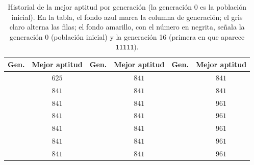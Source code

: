 \begin{table}[H]
\centering
\footnotesize
\setlength{\tabcolsep}{4pt}
\renewcommand{\arraystretch}{1.15}
\begin{tabular}{|c|c|c|c|c|c|}
\hline
\rowcolor{encabezado}\textbf{Gen.} & \textbf{Mejor aptitud} & \textbf{Gen.} & \textbf{Mejor aptitud} & \textbf{Gen.} & \textbf{Mejor aptitud} \\
\hline
\cellcolor{destacado}{\bfseries\boldmath $0$} & \cellcolor{destacado}$625$ & \cellcolor{iteracion}{\bfseries\boldmath $7$} & $841$ & \cellcolor{iteracion}{\bfseries\boldmath $14$} & $841$ \\
\hline
\cellcolor{iteracion}{\bfseries\boldmath $1$} & \cellcolor{cebra}$841$ & \cellcolor{iteracion}{\bfseries\boldmath $8$} & \cellcolor{cebra}$841$ & \cellcolor{iteracion}{\bfseries\boldmath $15$} & \cellcolor{cebra}$841$ \\
\hline
\cellcolor{iteracion}{\bfseries\boldmath $2$} & $841$ & \cellcolor{iteracion}{\bfseries\boldmath $9$} & $841$ & \cellcolor{destacado}{\bfseries\boldmath $16$} & \cellcolor{destacado}$961$ \\
\hline
\cellcolor{iteracion}{\bfseries\boldmath $3$} & \cellcolor{cebra}$841$ & \cellcolor{iteracion}{\bfseries\boldmath $10$} & \cellcolor{cebra}$841$ & \cellcolor{iteracion}{\bfseries\boldmath $17$} & \cellcolor{cebra}$961$ \\
\hline
\cellcolor{iteracion}{\bfseries\boldmath $4$} & $841$ & \cellcolor{iteracion}{\bfseries\boldmath $11$} & $841$ & \cellcolor{iteracion}{\bfseries\boldmath $18$} & $961$ \\
\hline
\cellcolor{iteracion}{\bfseries\boldmath $5$} & \cellcolor{cebra}$841$ & \cellcolor{iteracion}{\bfseries\boldmath $12$} & \cellcolor{cebra}$841$ & \cellcolor{iteracion}{\bfseries\boldmath $19$} & \cellcolor{cebra}$961$ \\
\hline
\cellcolor{iteracion}{\bfseries\boldmath $6$} & $841$ & \cellcolor{iteracion}{\bfseries\boldmath $13$} & $841$ & \cellcolor{iteracion}{\bfseries\boldmath $20$} & $961$ \\
\hline
\end{tabular}
\caption{Historial de la mejor aptitud por generación (la generación 0 es la población inicial). En la tabla, el fondo azul marca la columna de generación; el gris claro alterna las filas; el fondo amarillo, con el número en negrita, señala la generación 0 (población inicial) y la generación 16 (primera en que aparece \texttt{11111}).}
\label{tab:p1b-historial}
\end{table}
